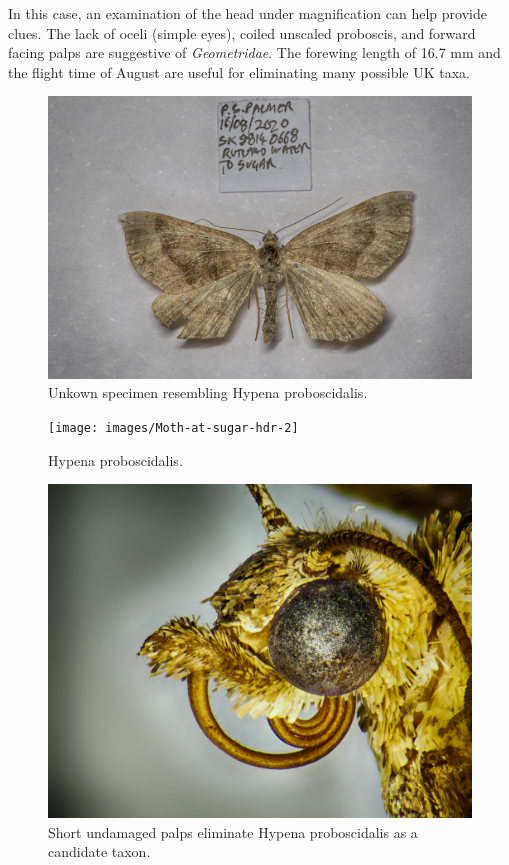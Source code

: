 \documentclass[]{article}
\begin{document}
In this case, an examination of the head under magnification can help provide clues. 
The lack of oceli (simple eyes), coiled unscaled proboscis, and forward facing palps are suggestive of \textit{Geometridae}. The forewing length of 16.7 mm and the flight time of August are useful for eliminating many possible UK taxa.



\begin{figure}
	\centering
	\includegraphics[width=0.5\linewidth]{images/202009131026PJP-1}
	\caption{Unkown specimen resembling Hypena proboscidalis.}
	\label{fig:202009131026pjp-1}
\end{figure}


\begin{figure}
	\centering
	\texttt{[image: images/Moth-at-sugar-hdr-2]}
	\caption{Hypena proboscidalis.}
	\label{fig:moth-at-sugar-hdr-2}
\end{figure}

\begin{figure}
	\centering
	\includegraphics[width=0.5\linewidth]{images/20201112-1}
	\caption{Short undamaged palps eliminate Hypena proboscidalis as a candidate taxon.}
	\label{fig:20201112-1}
\end{figure}



\end{document}
